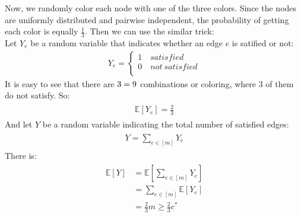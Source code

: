 \documentclass[titlepage, paper=a4, fontsize=11pt]{scrartcl} %
\numberwithin{equation}{section} %
\numberwithin{figure}{section} %
\numberwithin{table}{section} %
\begin{document}
Now, we randomly color each node with one of the three colors. Since the nodes are uniformly distributed and pairwise independent, the probability of getting each color is equally $\frac{1}{3}$. Then we can use the similar trick: \\
Let $Y_e$ be a random variable that indicates whether an edge $e$ is satified or not:
\begin{gather*}
Y_e =
\begin{cases}
1 \quad satisfied \\
0 \quad not\ satisfied \\
\end{cases}
\end{gather*}
It is easy to see that there are $3 \time 3 = 9$ combinations or coloring, where $3$ of them do not satisfy. So:
\begin{align*} 
\begin{split}
\mathbb{E}[Y_e]=\frac{2}{3}
\end{split}					
\end{align*}
And let $Y$ be a random variable indicating the total number of satisfied edges:
\begin{align*} 
\begin{split}
Y = \sum_{e \in [m]} Y_e
\end{split}					
\end{align*}
There is:
\begin{align*} 
\begin{split}
\mathbb{E}[Y] &= \mathbb{E}[\sum_{e \in [m]} Y_e] \\
&= \sum_{e \in [m]} \mathbb{E}[Y_e] \\
&= \frac{2}{3}m \geq \frac{2}{3}c^*
\end{split}					
\end{align*}
\\
\end{document}
